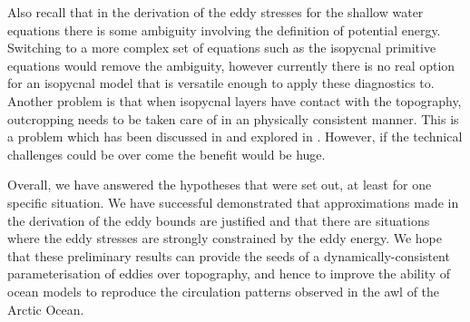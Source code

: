 \documentclass[12pt,a4paper]{report}
\begin{document}
  Also recall that in the derivation of the eddy stresses for the shallow water
  equations there is some ambiguity involving the definition of potential energy. 
  Switching to a more complex set of equations such as the isopycnal primitive equations
  would remove the ambiguity, however currently there is no real option for
  an isopycnal model that is versatile enough to apply these diagnostics to. Another
  problem is that when isopycnal layers have contact with the topography, 
  outcropping needs to be taken care of in an physically  consistent manner. This is a problem
  which has been discussed in \cite{dell2010abyssal} and explored in \cite{diehl2012working}. However, if the technical challenges could be over come
  the benefit would be huge.
  
  Overall, we have answered the hypotheses that were set out, at least for one specific
  situation. We have successful demonstrated that approximations made in the
  derivation of the eddy bounds are justified and that there are situations where
  the eddy stresses are strongly constrained by the eddy energy. We hope that these preliminary
  results can provide the seeds of a dynamically-consistent parameterisation of
  eddies over topography, and hence to improve the ability of ocean models to reproduce
  the circulation patterns observed in the \gls{awl} of the Arctic Ocean.

	 \printbibliography
\end{document}
